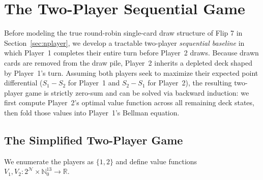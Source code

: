 \documentclass{article}
\theoremstyle{plain}
\theoremstyle{definition}
\theoremstyle{remark}
\begin{document}
\section{The Two-Player Sequential Game}
Before modeling the true round-robin single-card draw structure of Flip 7 in Section~\ref{sec:nplayer}, we develop a tractable two-player \textit{sequential baseline} in which Player~1 completes their entire turn before Player~2 draws. Because drawn cards are removed from the draw pile, Player~2 inherits a depleted deck shaped by Player~1's turn. Assuming both players seek to maximize their expected point differential ($S_1 - S_2$ for Player~1 and $S_2 - S_1$ for Player~2), the resulting two-player game is strictly zero-sum and can be solved via backward induction: we first compute Player~2's optimal value function across all remaining deck states, then fold those values into Player~1's Bellman equation.

\subsection{The Simplified Two-Player Game}
We enumerate the players as $\{1, 2\}$ and define value functions $V_1, V_2: 2^{\mathcal{N}} \times \mathbb{N}_0^{13} \to \mathbb{R}$.
\end{document}
